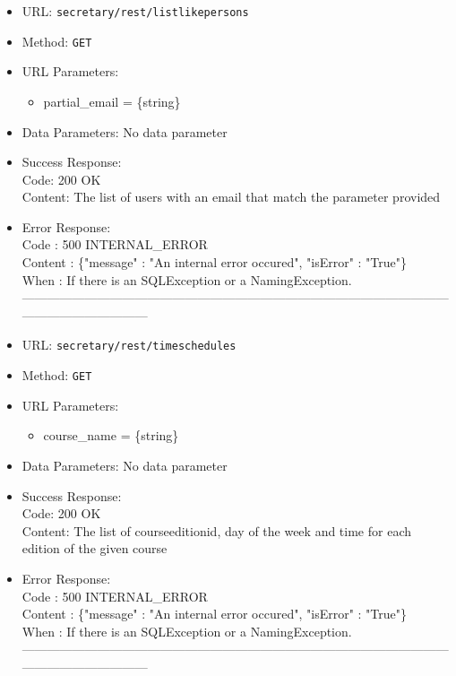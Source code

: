 \begin{itemize}
    \item URL: \texttt{secretary/rest/listlikepersons}
    \item Method: \texttt{GET}
    \item URL Parameters:
    	\begin{itemize}
    		\item partial\_email = \{string\}    		
    	\end{itemize}
    \item Data Parameters: No data parameter
    \item Success Response:\\
    Code: 200 OK\\
    Content: The list of users with an email that match the parameter provided
    \item Error Response:\\
    Code : 500 INTERNAL\_ERROR\\
    Content : \{"message" : "An internal error occured", "isError" : "True"\}\\
    When : If there is an SQLException or a NamingException.\\
------------------------------------------------------------------------------------------------------------------------------------
    \item URL: \texttt{secretary/rest/timeschedules}
    \item Method: \texttt{GET}
    \item URL Parameters:
    \begin{itemize}
    	\item course\_name = \{string\}    		
    \end{itemize}
    \item Data Parameters: No data parameter
    \item Success Response:\\
    Code: 200 OK\\
    Content: The  list of courseeditionid, day of the week and time for each edition of the given course        
    \item Error Response:\\
    Code : 500 INTERNAL\_ERROR\\
    Content : \{"message" : "An internal error occured", "isError" : "True"\}\\
    When : If there is an SQLException or a NamingException.\\
------------------------------------------------------------------------------------------------------------------------------------

\end{itemize}
